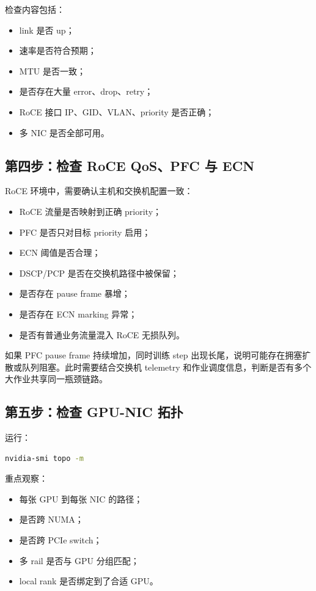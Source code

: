 检查内容包括：

\begin{itemize}
  \item link 是否 up；
  \item 速率是否符合预期；
  \item MTU 是否一致；
  \item 是否存在大量 error、drop、retry；
  \item RoCE 接口 IP、GID、VLAN、priority 是否正确；
  \item 多 NIC 是否全部可用。
\end{itemize}

\subsection{第四步：检查 RoCE QoS、PFC 与 ECN}
\label{subsec:debug-roce-qos}

RoCE 环境中，需要确认主机和交换机配置一致：

\begin{itemize}
  \item RoCE 流量是否映射到正确 priority；
  \item PFC 是否只对目标 priority 启用；
  \item ECN 阈值是否合理；
  \item DSCP/PCP 是否在交换机路径中被保留；
  \item 是否存在 pause frame 暴增；
  \item 是否存在 ECN marking 异常；
  \item 是否有普通业务流量混入 RoCE 无损队列。
\end{itemize}

如果 PFC pause frame 持续增加，同时训练 step 出现长尾，说明可能存在拥塞扩散或队列阻塞。此时需要结合交换机 telemetry 和作业调度信息，判断是否有多个大作业共享同一瓶颈链路。

\subsection{第五步：检查 GPU-NIC 拓扑}
\label{subsec:debug-gpu-nic-topology}

运行：

\begin{lstlisting}[language=bash,caption={检查 GPU 与 NIC 拓扑},label={lst:gpu-nic-topology}]
nvidia-smi topo -m
\end{lstlisting}

重点观察：

\begin{itemize}
  \item 每张 GPU 到每张 NIC 的路径；
  \item 是否跨 NUMA；
  \item 是否跨 PCIe switch；
  \item 多 rail 是否与 GPU 分组匹配；
  \item local rank 是否绑定到了合适 GPU。
\end{itemize}

